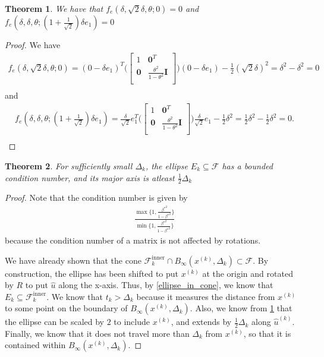 \documentclass{article}
\newtheorem{theorem}{Theorem}[section]
\theoremstyle{case}
\newcommand{\dk}{\Delta_k}
\newcommand{\xk}{{x^{(k)}}}
\newcommand{\huk}{{{\hat u}^{(k)}}}
\newcommand{\bs}{{\beta^{\star}}}
\newcommand{\fcki}{{\mathcal {F}^{\text{inner}}_k}}
\newcommand{\f}{{\mathcal F}}
\begin{document}
\begin{theorem}
\label{ellipse_fits}
We have that $f_e(\delta, \sqrt{2}\delta, \theta; 0) = 0$ and $f_e(\delta, \delta, \theta; (1 + \frac{1}{\sqrt{2}}) \delta e_1) = 0$
\end{theorem}
\begin{proof}

We have
\begin{align*}
f_e(\delta, \sqrt{2}\delta, \theta; 0) =(0 - \delta e_1)^T\bigg(\begin{bmatrix}
1 & \boldsymbol0^T \\
\boldsymbol 0 & \frac{\theta^2}{1 - \theta^2} \boldsymbol I \\
\end{bmatrix}\bigg)(0 - \delta e_1) - \frac 1 2 (\sqrt 2 \delta)^2
=\delta^2 - \delta^2 = 0\\
\end{align*}
and
\begin{align*}
f_e(\delta, \delta, \theta; (1 + \frac{1}{\sqrt{2}}) \delta e_1) =\frac {\delta}{\sqrt{2}}e_1^T\bigg(\begin{bmatrix}
1 & \boldsymbol0^T \\
\boldsymbol 0 & \frac{\theta^2}{1 - \theta^2} \boldsymbol I \\
\end{bmatrix}\bigg)\frac {\delta}{\sqrt{2}}e_1 - \frac 1 2 \delta^2
=\frac 1 2 \delta^2 - \frac 1 2 \delta^2 = 0.\\
\end{align*}

\end{proof}

\begin{theorem}
For sufficiently small $\dk$, the ellipse $E_k \subseteq \f$ has a bounded condition number, and its major axis is atleast $\frac 1 2 \dk$
\end{theorem}

\begin{proof}
Note that the condition number is given by
\begin{align*}
\frac{\max\{1, \frac{\bs^2}{1 - \bs^2}\}}{\min\{1, \frac{\bs^2}{1 - \bs^2}\}}
\end{align*}
because the condition number of a matrix is not affected by rotations.

We have already shown that the cone $\fcki \cap B_{\infty}(\xk, \dk) \subset \f$.
By construction, the ellipse has been shifted to put $\xk$ at the origin and rotated by $R$ to put $\hat u$ along the x-axis.
Thus, by \cref{ellipse_in_cone}, we know that $E_k \subseteq \fcki$.
We know that $t_k > \dk$ because it measures the distance from $\xk$ to some point on the boundary of $B_{\infty}(\xk, \dk)$.
Also, we know from \cref{ellipse_fits} that the ellipse can be scaled by $2$ to include $\xk$, and extends by $\frac 1 2 \dk$ along $\huk$.
Finally, we know that it does not travel more than $\dk$ from $\xk$, so that it is contained within $B_{\infty}(\xk, \dk)$.
\end{proof}
\end{document}
